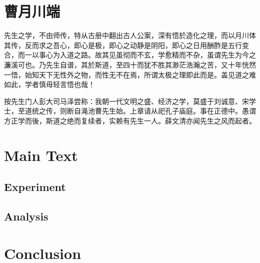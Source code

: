 \documentclass[
    author = Sweet Pastry,
    affiliation = Fudan University,
    column = onecolumn,
    ref = refDemo.bib,
    lang = cn
]{spArticle}
\begin{document}
    \section{曹月川端}
    先生之学，不由师传，特从古册中翻出古人公案，深有悟於造化之理，而以月川体其传，反而求之吾心，即心是极，即心之动静是阴阳，即心之日用酬酢是五行变合，而一以事心为入道之路。故其见虽彻而不玄，学愈精而不杂，虽谓先生为今之濂溪可也。乃先生自谱，其於斯道，至四十而犹不胜其渺茫浩瀚之苦，又十年恍然一悟，始知天下无性外之物，而性无不在焉，所谓太极之理即此而是。盖见道之难如此，学者慎毋轻言悟也哉！

    按先生门人彭大司马泽尝称：我朝一代文明之盛、经济之学，莫盛于刘诚意、宋学士，至道统之传，则断自渑池曹先生始。上章请从祀孔子庙庭。事在正德中。愚谓方正学而後，斯道之绝而复续者，实赖有先生一人。薛文清亦闻先生之风而起者。

    \section{Main Text}
        \subsection{Experiment}
            \lipsum[6-8]
        \subsection{Analysis}
            \lipsum[9-11]

    \section{Conclusion}
        \lipsum[12-14]
\end{document}
